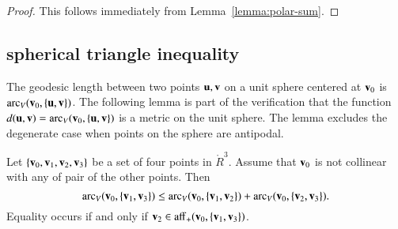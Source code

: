 \begin{proof} This follows immediately from 
Lemma~\ref{lemma:polar-sum}.
\end{proof}


\subsection{spherical triangle inequality} %
%
%

The geodesic length between two points
${\mathbf u},{\mathbf v}$ on a unit sphere centered at ${\mathbf v}_0$ is $\operatorname{arc}_V({\mathbf v}_0,\{{\mathbf u},{\mathbf v}\})$.
The following lemma is part of the verification that
the function $d({\mathbf u},{\mathbf v}) = \operatorname{arc}_V({\mathbf v}_0,\{{\mathbf u},{\mathbf v}\})$ is a metric
on the unit sphere.  The lemma excludes the degenerate case when
points on the sphere are antipodal.
%

\begin{lemma}[]\label{lemma:sph-tri-ineq}
Let $\{{\mathbf v}_0,{\mathbf v}_1,{\mathbf v}_2,{\mathbf v}_3\}$ be a set of four points in $\ring{R}^3$.
Assume that ${\mathbf v}_0$ is not collinear with any of pair of the other points.
Then
\begin{displaymath}
  \operatorname{arc}_V({\mathbf v}_0,\{{\mathbf v}_1,{\mathbf v}_3\}) \le \operatorname{arc}_V({\mathbf v}_0,\{{\mathbf v}_1,{\mathbf v}_2\}) + \operatorname{arc}_V({\mathbf v}_0,\{{\mathbf v}_2,{\mathbf v}_3\}).
\end{displaymath}
Equality occurs if and only if ${\mathbf v}_2\in{\operatorname{aff}}_+({\mathbf v}_0,\{{\mathbf v}_1,{\mathbf v}_3\})$.
\end{lemma}

